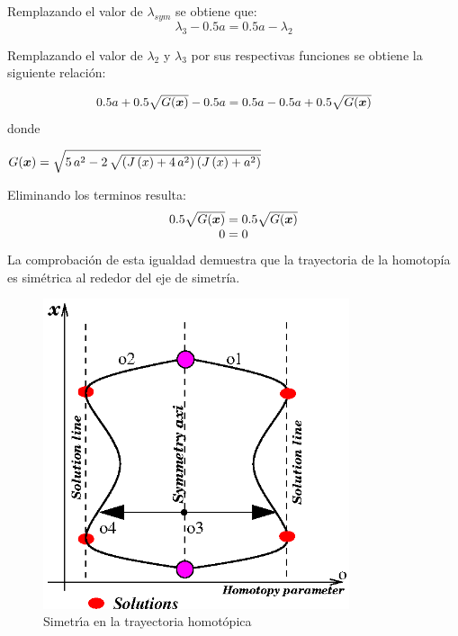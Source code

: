 \documentclass[conference,letterpaper,onecolumn]{IEEEtran}
\newcommand{\pig}[1]{\mbox{\boldmath ${#1}$}	}
\begin{document}
Remplazando el valor de $\lambda_{sym}$ se obtiene que:
\begin{displaymath}
\lambda_3-0.5a=0.5a-\lambda_2
\end{displaymath}

Remplazando el valor de $\lambda_2$ y $\lambda_3$ por sus respectivas funciones se obtiene la siguiente relaci\'on:

\begin{displaymath}
\begin{array}{l}
0.5a+0.5\sqrt{G(\pig{x})}-0.5a= 0.5a-0.5a+0.5\sqrt{G(\pig{x})}
\end{array}
\end{displaymath}
donde {\small $G(\pig{x})=\sqrt {5\,{a}^{2}-2\,\sqrt { \left( J \left( x \right) +4 \,{a}^{2} \right)  \left( J \left( x \right) +{a}^{2} \right)}} $


Eliminando los terminos resulta:
\begin{displaymath}
\begin{array}{c}
0.5\sqrt{G(\pig{x})}=0.5\sqrt{G(\pig{x})} \\
0=0
\end{array}
\end{displaymath}
La comprobaci\'on de esta igualdad demuestra que la trayectoria de la homotop{\'i}a es sim\'etrica al rededor del eje de simetr{\'i}a.


{
\tiny
\begin{figure}[hbtp]
\centering
\includegraphics[width=9cm]{figs/simetria.eps}
\caption{Simetr\'{\i}a en la trayectoria homot\'opica}
\label{simetria}
\end{figure}
}



}
\end{document}
